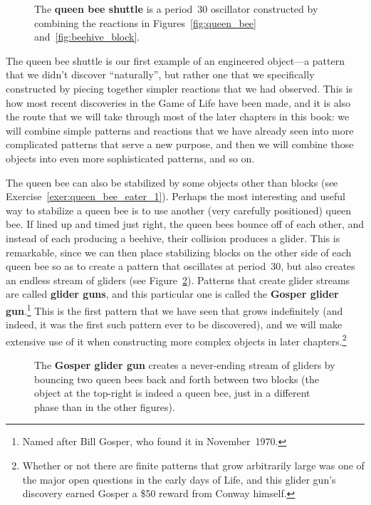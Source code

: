 \begin{figure}[!ht]
	\centering{}
	\caption{The \textbf{queen bee shuttle} is a period~30 oscillator constructed by combining the reactions in Figures~\ref{fig:queen_bee} and~\ref{fig:beehive_block}.}\label{fig:queen_bee_shuttle}
\end{figure}

The queen bee shuttle is our first example of an engineered object---a pattern that we didn't discover ``naturally'', but rather one that we specifically constructed by piecing together simpler reactions that we had observed. This is how most recent discoveries in the Game of Life have been made, and it is also the route that we will take through most of the later chapters in this book: we will combine simple patterns and reactions that we have already seen into more complicated patterns that serve a new purpose, and then we will combine those objects into even more sophisticated patterns, and so on.

The queen bee can also be stabilized by some objects other than blocks (see Exercise~\ref{exer:queen_bee_eater_1}). Perhaps the most interesting and useful way to stabilize a queen bee is to use another (very carefully positioned) queen bee. If lined up and timed just right, the queen bees bounce off of each other, and instead of each producing a beehive, their collision produces a glider. This is remarkable, since we can then place stabilizing blocks on the other side of each queen bee so as to create a pattern that oscillates at period~30, but also creates an endless stream of gliders (see Figure~\ref{fig:gosper_glider_gun}). Patterns that create glider streams are called \textbf{glider guns}, and this particular one is called the \textbf{Gosper glider gun}.\footnote{Named after Bill Gosper, who found it in November~1970.} This is the first pattern that we have seen that grows indefinitely (and indeed, it was the first such pattern ever to be discovered), and we will make extensive use of it when constructing more complex objects in later chapters.\footnote{Whether or not there are finite patterns that grow arbitrarily large was one of the major open questions in the early days of Life, and this glider gun's discovery earned Gosper a \$50 reward from Conway himself.}

\begin{figure}[!htb]
	\centering{}
	\caption{The \textbf{Gosper glider gun} creates a never-ending stream of gliders by bouncing two queen bees back and forth between two blocks (the object at the top-right is indeed a queen bee, just in a different phase than in the other figures).}\label{fig:gosper_glider_gun}
\end{figure}


